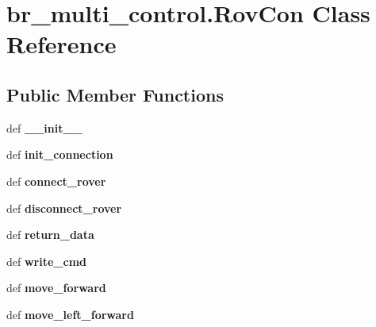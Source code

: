 \hypertarget{classbr__multi__control_1_1RovCon}{\section{br\-\_\-multi\-\_\-control.\-Rov\-Con Class Reference}
\label{classbr__multi__control_1_1RovCon}
}
\subsection*{Public Member Functions}
\begin{DoxyCompactItemize}
\item 
\hypertarget{classbr__multi__control_1_1RovCon_ac3365bbf2222d4c711f9f6d2d5162ead}{def {\bfseries \-\_\-\-\_\-init\-\_\-\-\_\-}}\label{classbr__multi__control_1_1RovCon_ac3365bbf2222d4c711f9f6d2d5162ead}

\item 
\hypertarget{classbr__multi__control_1_1RovCon_ac1c74e6f8fe87699b6a9a76b3a0ab4c8}{def {\bfseries init\-\_\-connection}}\label{classbr__multi__control_1_1RovCon_ac1c74e6f8fe87699b6a9a76b3a0ab4c8}

\item 
\hypertarget{classbr__multi__control_1_1RovCon_a7bd168ecf0c6760e969fb694eead8c39}{def {\bfseries connect\-\_\-rover}}\label{classbr__multi__control_1_1RovCon_a7bd168ecf0c6760e969fb694eead8c39}

\item 
\hypertarget{classbr__multi__control_1_1RovCon_ad664d0ad31e81396dafafa0dc9faf375}{def {\bfseries disconnect\-\_\-rover}}\label{classbr__multi__control_1_1RovCon_ad664d0ad31e81396dafafa0dc9faf375}

\item 
\hypertarget{classbr__multi__control_1_1RovCon_a3cd3a59070e653952f9964dffc917491}{def {\bfseries return\-\_\-data}}\label{classbr__multi__control_1_1RovCon_a3cd3a59070e653952f9964dffc917491}

\item 
\hypertarget{classbr__multi__control_1_1RovCon_a107f7dd2da240391a8f0c0f4921984c7}{def {\bfseries write\-\_\-cmd}}\label{classbr__multi__control_1_1RovCon_a107f7dd2da240391a8f0c0f4921984c7}

\item 
\hypertarget{classbr__multi__control_1_1RovCon_a45c79847fd62ba78796bc746742a0524}{def {\bfseries move\-\_\-forward}}\label{classbr__multi__control_1_1RovCon_a45c79847fd62ba78796bc746742a0524}

\item 
\hypertarget{classbr__multi__control_1_1RovCon_a59b1edb9484c65ba5381d0621c01884c}{def {\bfseries move\-\_\-left\-\_\-forward}}\label{classbr__multi__control_1_1RovCon_a59b1edb9484c65ba5381d0621c01884c}

\end{DoxyCompactItemize}
